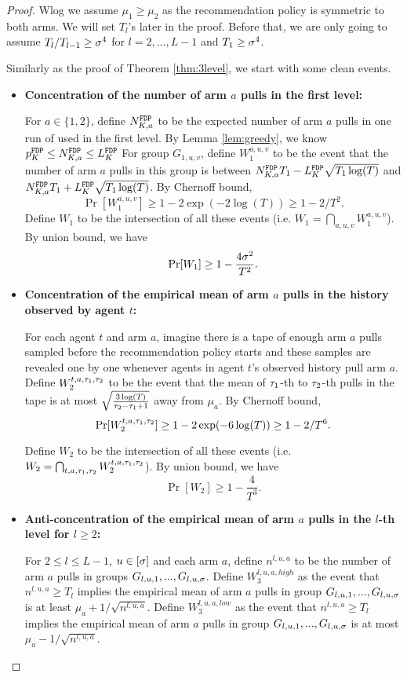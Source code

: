 \begin{proof}
Wlog we assume $\mu_1 \geq \mu_2$ as the recommendation policy is symmetric to both arms. We will set $T_l$'s later in the proof. Before that, we are only going to assume $T_l / T_{l-1} \geq \sigma^4$ for $l=2,...,L-1$ and $T_1 \geq \sigma^4$.

Similarly as the proof of Theorem \ref{thm:3level}, we start with some clean events.

\begin{itemize}
\item  \textbf{Concentration of the number of arm $a$ pulls in the first level:}

For $a \in \{1,2\}$, define $N^\mathtt{FDP}_{K,a}$ to be the expected number of arm $a$ pulls in one run of \ALGG used in the first level. By Lemma \ref{lem:greedy}, we know $p^\mathtt{FDP}_K \leq N^\mathtt{FDP}_{K,a} \leq L^\mathtt{FDP}_K$ For group $G_{1,u,v}$, define $W_1^{a,u,v}$ to be the event that the number of arm $a$ pulls in this group is between $N^\mathtt{FDP}_{K,a} T_1- L^\mathtt{FDP}_K \sqrt{T_1\log(T)}$ and $N^\mathtt{FDP}_{K,a} T_1 + L^\mathtt{FDP}_K \sqrt{T_1\log(T)}$. By Chernoff bound,
\[
\Pr[W_1^{a,u,v}] \geq 1-2\exp(-2\log(T)) \geq 1-2/T^2.
\]
Define $W_1$ to be the intersection of all these events (i.e. $W_1 = \bigcap_{a,u,v}W_1^{a,u,v}$). By union bound, we have
\[
\Pr[W_1] \geq 1- \frac{4\sigma^2}{T^2}.
\]


\item \textbf{Concentration of the empirical mean of arm $a$ pulls in the history observed by agent $t$:}

 For each agent $t$ and arm $a$, imagine there is a tape of enough arm $a$ pulls sampled before the recommendation policy starts and these samples are revealed one by one whenever agents in agent $t$'s observed history pull arm $a$.  Define $W_2^{t,a,\tau_1,\tau_2}$ to be the event that the mean of $\tau_1$-th to $\tau_2$-th pulls in the tape is at most $\sqrt{\frac{3\log(T)}{\tau_2-\tau_1+1}}$ away from $\mu_a$. By Chernoff bound,
\[
\Pr[W_2^{t,a,\tau_1,\tau_2}] \geq 1 - 2\exp(-6\log(T)) \geq 1- 2/T^6.
\]

Define $W_2$ to be the intersection of all these events (i.e. $W_2 = \bigcap_{t,a,\tau_1,\tau_2} W_2^{t,a,\tau_1,\tau_2}$). By union bound, we have
\[
\Pr[W_2] \geq 1- \frac{4}{T^3}.
\]


\item \textbf{Anti-concentration of the empirical mean of arm $a$ pulls in the $l$-th level  for $l \geq 2$:}

For $2\leq l \leq L-1$, $u\in [\sigma]$ and each arm $a$, define $n^{l,u,a}$ to be the number of arm $a$ pulls in groups $G_{l,u,1},...,G_{l,u,\sigma}$. Define $W_3^{l,u,a,high}$ as the event that $n^{l,u,a} \geq T_l$ implies the empirical mean of arm $a$ pulls in group $G_{l,u,1},...,G_{l,u,\sigma}$ is at least $\mu_a + 1/\sqrt{n^{l,u,a}}$. Define $W_3^{l,u,a,low}$ as the event that $n^{l,u,a} \geq T_l$ implies the empirical mean of arm $a$ pulls in group $G_{l,u,1},...,G_{l,u,\sigma}$ is at most $\mu_a - 1/\sqrt{n^{l,u,a}}$.


\end{itemize}
\end{proof}
